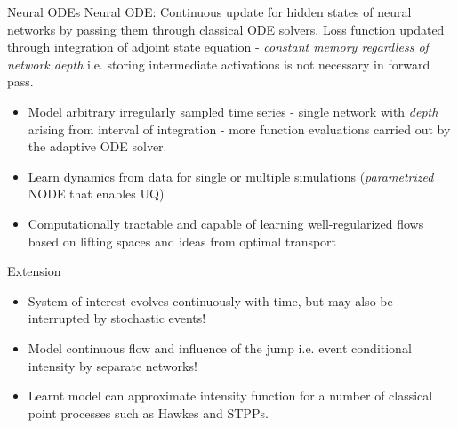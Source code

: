 \documentclass{beamer}
\begin{document}
\begin{frame}{Neural ODEs}
    Neural ODE: Continuous update for hidden states of neural networks by passing them through classical ODE solvers. Loss function updated through integration of adjoint state equation - \emph{constant memory regardless of network depth} i.e. storing intermediate activations is not necessary in forward pass.

    \begin{itemize}
        \item Model arbitrary irregularly sampled time series - single network with \emph{depth} arising from interval of integration - more function evaluations carried out by the adaptive ODE solver.

        \item Learn dynamics from data for single or multiple simulations (\emph{parametrized} NODE that enables UQ)

        \item Computationally tractable and capable of learning well-regularized flows based on lifting spaces and ideas from optimal transport
    \end{itemize}
\end{frame}

\begin{frame}{Extension}
    \begin{itemize}
        \item System of interest evolves continuously with time, but may also be interrupted by stochastic events!

        \item Model continuous flow and influence of the jump i.e. event conditional intensity by separate networks!

        \item Learnt model can approximate intensity function for a number of classical point processes such as Hawkes and STPPs. \cite{jia_neural_2020,chen_neural_2020}
    \end{itemize}
\end{frame}

    


\end{document}
